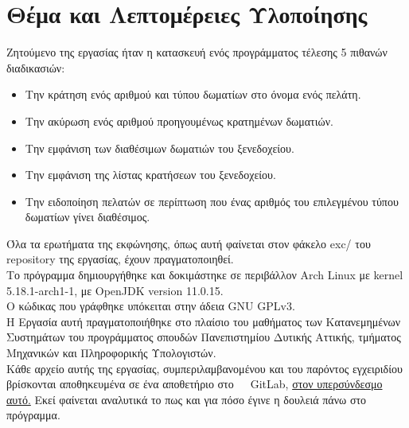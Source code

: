 \section*{Θέμα και Λεπτομέρειες Υλοποίησης}
\begin{addmargin}[2em]{3em}%
\footnotesize{
    Ζητούμενο της εργασίας ήταν η κατασκευή ενός προγράμματος τέλεσης 5 πιθανών
    διαδικασιών:
    \begin{itemize}
        \item Την κράτηση ενός αριθμού και τύπου δωματίων στο όνομα ενός πελάτη.
        \item Την ακύρωση ενός αριθμού προηγουμένως κρατημένων δωματιών.
        \item Την εμφάνιση των διαθέσιμων δωματιών του ξενεδοχείου.
        \item Την εμφάνιση της λίστας κρατήσεων του ξενεδοχείου.
        \item Την ειδοποίηση πελατών σε περίπτωση που ένας αριθμός του
            επιλεγμένου τύπου δωματίων γίνει διαθέσιμος.
    \end{itemize}
    Όλα τα ερωτήματα της εκφώνησης, όπως αυτή φαίνεται στον φάκελο exc/ του
    repository της εργασίας, έχουν πραγματοποιηθεί.
    \\
    Το πρόγραμμα δημιουργήθηκε και δοκιμάστηκε σε περιβάλλον Arch Linux
    με kernel 5.18.1-arch1-1, με OpenJDK version 11.0.15.
    \\
    Ο κώδικας που γράφθηκε υπόκειται στην άδεια GNU GPLv3.
    \\
    Η Εργασία αυτή πραγματοποιήθηκε στο πλαίσιο του μαθήματος των Κατανεμημένων
    Συστημάτων του προγράμματος σπουδών Πανεπιστημίου Δυτικής Αττικής, τμήματος
    Μηχανικών και Πληροφορικής Υπολογιστών.
    \\
    \color{blue}
    Κάθε αρχείο αυτής της εργασίας, συμπεριλαμβανομένου και του παρόντος
    εγχειριδίου βρίσκονται αποθηκευμένα σε ένα αποθετήριο στο\gitlab{}\ \  \ 
    GitLab,
    \href{https://gitlab.com/nionios/java-hotel}
    {στον υπερσύνδεσμο αυτό.}
    \color{black}
    Εκεί φαίνεται αναλυτικά το πως και για πόσο έγινε η δουλειά πάνω
    στο πρόγραμμα.
}
\end{addmargin}
